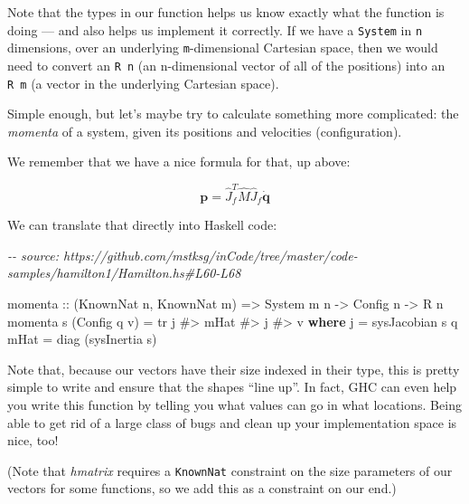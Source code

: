 \documentclass[]{article}
\newenvironment{Shaded}{}{}
\newcommand{\CommentTok}[1]{\textcolor[rgb]{0.38,0.63,0.69}{\textit{#1}}}
\newcommand{\DataTypeTok}[1]{\textcolor[rgb]{0.56,0.13,0.00}{#1}}
\newcommand{\KeywordTok}[1]{\textcolor[rgb]{0.00,0.44,0.13}{\textbf{#1}}}
\newcommand{\NormalTok}[1]{#1}
\newcommand{\OperatorTok}[1]{\textcolor[rgb]{0.40,0.40,0.40}{#1}}
\newcommand{\OtherTok}[1]{\textcolor[rgb]{0.00,0.44,0.13}{#1}}
\begin{document}
Note that the types in our function helps us know exactly what the function is
doing --- and also helps us implement it correctly. If we have a \texttt{System}
in \texttt{n} dimensions, over an underlying \texttt{m}-dimensional Cartesian
space, then we would need to convert an \texttt{R\ n} (an n-dimensional vector
of all of the positions) into an \texttt{R\ m} (a vector in the underlying
Cartesian space).

Simple enough, but let's maybe try to calculate something more complicated: the
\emph{momenta} of a system, given its positions and velocities (configuration).

We remember that we have a nice formula for that, up above:

\[
\mathbf{p} = \hat{J}_f^T \hat{M} \hat{J}_f \dot{\mathbf{q}}
\]

We can translate that directly into Haskell code:

\begin{Shaded}
\begin{Highlighting}[]
\CommentTok{{-}{-} source: https://github.com/mstksg/inCode/tree/master/code{-}samples/hamilton1/Hamilton.hs\#L60{-}L68}

\NormalTok{momenta}
\OtherTok{    ::}\NormalTok{ (}\DataTypeTok{KnownNat}\NormalTok{ n, }\DataTypeTok{KnownNat}\NormalTok{ m)}
    \OtherTok{=>} \DataTypeTok{System}\NormalTok{ m n}
    \OtherTok{{-}>} \DataTypeTok{Config}\NormalTok{ n}
    \OtherTok{{-}>} \DataTypeTok{R}\NormalTok{ n}
\NormalTok{momenta s (}\DataTypeTok{Config}\NormalTok{ q v) }\OtherTok{=}\NormalTok{ tr j }\OperatorTok{\#>}\NormalTok{ mHat }\OperatorTok{\#>}\NormalTok{ j }\OperatorTok{\#>}\NormalTok{ v}
  \KeywordTok{where}
\NormalTok{    j    }\OtherTok{=}\NormalTok{ sysJacobian s q}
\NormalTok{    mHat }\OtherTok{=}\NormalTok{ diag (sysInertia s)}
\end{Highlighting}
\end{Shaded}

Note that, because our vectors have their size indexed in their type, this is
pretty simple to write and ensure that the shapes ``line up''. In fact, GHC can
even help you write this function by telling you what values can go in what
locations. Being able to get rid of a large class of bugs and clean up your
implementation space is nice, too!

(Note that \emph{hmatrix} requires a \texttt{KnownNat} constraint on the size
parameters of our vectors for some functions, so we add this as a constraint on
our end.)
\end{document}
